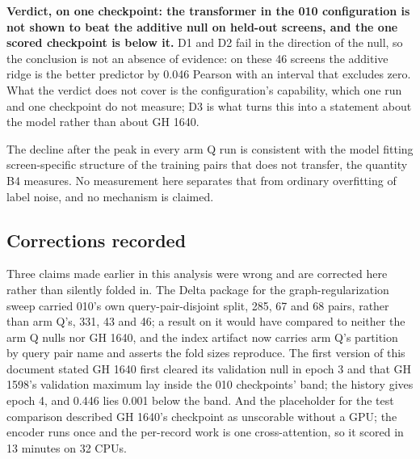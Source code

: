 \begin{table}[htbp]
\centering
\footnotesize
\caption{The decision on the evidence available. D3 has not been run and the
verdict is provisional on it.}
\label{tab:decision}

\end{table}

\textbf{Verdict, on one checkpoint: the transformer in the 010 configuration is not
shown to beat the additive null on held-out screens, and the one scored checkpoint
is below it.} D1 and D2 fail in the direction of the null, so the conclusion is not
an absence of evidence: on these 46 screens the additive ridge is the better
predictor by 0.046 Pearson with an interval that excludes zero. What the verdict
does not cover is the configuration's capability, which one run and one checkpoint
do not measure; D3 is what turns this into a statement about the model rather than
about GH 1640.

The decline after the peak in every arm Q run is consistent with the model fitting
screen-specific structure of the training pairs that does not transfer, the
quantity B4 measures. No measurement here separates that from ordinary overfitting
of label noise, and no mechanism is claimed.

\subsection{Corrections recorded}
\label{sec:corrections}

Three claims made earlier in this analysis were wrong and are corrected here
rather than silently folded in. The Delta package for the graph-regularization
sweep carried 010's own query-pair-disjoint split, 285, 67 and 68 pairs, rather
than arm Q's, 331, 43 and 46; a result on it would have compared to neither the arm
Q nulls nor GH 1640, and the index artifact now carries arm Q's partition by query
pair name and asserts the fold sizes reproduce. The first version of this document
stated GH 1640 first cleared its validation null in epoch 3 and that GH 1598's
validation maximum lay inside the 010 checkpoints' band; the history gives epoch 4,
and 0.446 lies 0.001 below the band. And the placeholder for the test comparison
described GH 1640's checkpoint as unscorable without a GPU; the encoder runs once
and the per-record work is one cross-attention, so it scored in 13 minutes on 32
CPUs.
